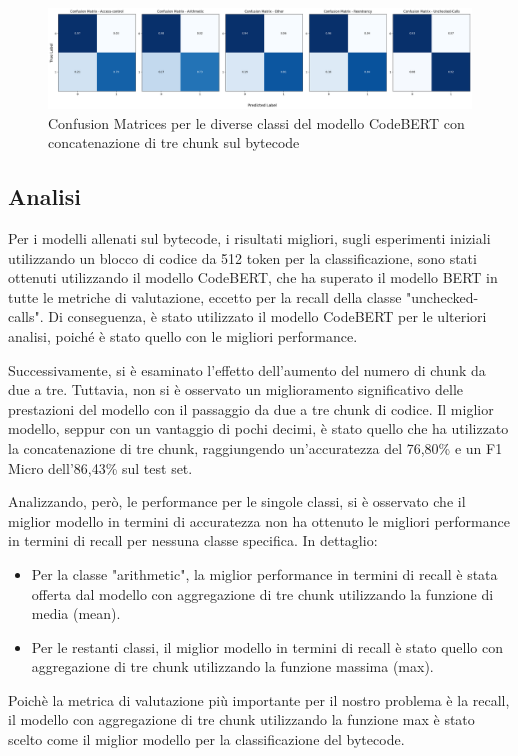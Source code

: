 \documentclass[../../Thesis.tex]{subfiles}
\begin{document}
\begin{figure}[H]
    \includegraphics[width=1.05\textwidth]{../../img/CFConcat3-BC.png}
    \caption{Confusion Matrices per le diverse classi del modello CodeBERT con concatenazione di tre chunk sul bytecode}
\end{figure}

\subsection{Analisi}
Per i modelli allenati sul bytecode, i risultati migliori, sugli esperimenti iniziali utilizzando un blocco di codice da 512 token per la classificazione, sono stati ottenuti utilizzando il modello CodeBERT, che ha superato il modello BERT in tutte le metriche di valutazione, eccetto per la recall della classe "unchecked-calls". Di conseguenza, è stato utilizzato il modello CodeBERT per le ulteriori analisi, poiché è stato quello con le migliori performance.

Successivamente, si è esaminato l'effetto dell'aumento del numero di chunk da due a tre. Tuttavia, non si è osservato un miglioramento significativo delle prestazioni del modello con il passaggio da due a tre chunk di codice. Il miglior modello, seppur con un vantaggio di pochi decimi, è stato quello che ha utilizzato la concatenazione di tre chunk, raggiungendo un'accuratezza del 76,80\% e un F1 Micro dell'86,43\% sul test set.

Analizzando, però, le performance per le singole classi, si è osservato che il miglior modello in termini di accuratezza non ha ottenuto le migliori performance in termini di recall per nessuna classe specifica. In dettaglio:
\begin{itemize}
    \item Per la classe "arithmetic", la miglior performance in termini di recall è stata offerta dal modello con aggregazione di tre chunk utilizzando la funzione di media (mean).
    \item Per le restanti classi, il miglior modello in termini di recall è stato quello con aggregazione di tre chunk utilizzando la funzione massima (max).
\end{itemize}
Poichè la metrica di valutazione più importante per il nostro problema è la recall, il modello con aggregazione di tre chunk utilizzando la funzione max è stato scelto come il miglior modello per la classificazione del bytecode.
\end{document}
